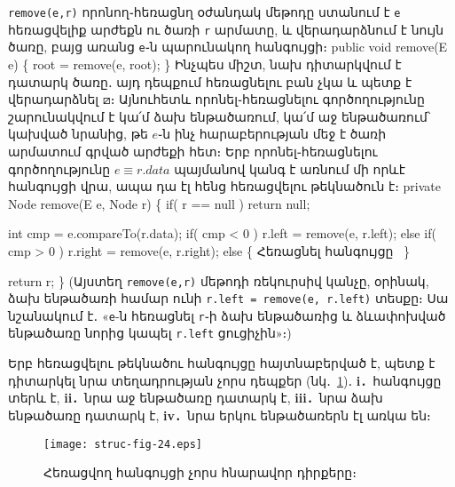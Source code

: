 \texttt{remove(e,r)} որոնող֊հեռացնղ օժանդակ մեթոդը 
ստանում է \texttt{e} հեռացվելիք արժեքն ու ծառի \texttt{r} 
արմատը, և վերադարձնում է նույն ծառը, բայց առանց \texttt{e}֊ն 
պարունակող հանգույցի։
\nwenddocs{}\endmoddef{}
public void remove(E e)
\{
  root = remove(e, root);
\}
\nwendcode{}\nwdocspar
Ինչպես միշտ, նախ դիտարկվում է դատարկ ծառը․ այդ դեպքում 
հեռացնելու բան չկա և պետք է վերադարձնել \(\boxslash\)։ 
Այնուհետև որոնել֊հեռացնելու գործողությունը շարունակվում 
է կա՛մ ձախ ենթածառում, կա՛մ աջ ենթածառում՝ կախված նրանից, 
թե \(e\)֊ն ինչ հարաբերության մեջ է ծառի արմատում գրված 
արժեքի հետ։ Երբ որոնել֊հեռացնելու գործողությունը 
\(e\equiv r.data\) պայմանով կանգ է առնում մի որևէ հանգույցի 
վրա, ապա դա էլ հենց հեռացվելու թեկնածուն է։
\nwenddocs{}\plusendmoddef
private Node remove(E e, Node r)
\{
  if( r == null )
    return null;

  int cmp = e.compareTo(r.data);
  if( cmp < 0 )
    r.left = remove(e, r.left);
  else if( cmp > 0 )
    r.right = remove(e, r.right);
  else \{
    \LA{}Հեռացնել հանգույցը~{\nwtagstyle{}}\RA{}
  \}

  return r;
\}
\nwendcode{}\nwdocspar
(Այստեղ \texttt{remove(e,r)} մեթոդի ռեկուրսիվ կանչը, 
օրինակ, ձախ ենթածառի համար ունի 
\texttt{r.left = remove(e, r.left)} տեսքը։ Սա նշանակում 
է․ «\texttt{e}-ն հեռացնել \texttt{r}֊ի ձախ ենթածառից և 
ձևափոխված ենթածառը նորից կապել \texttt{r.left} ցուցիչին»։)

Երբ հեռացվելու թեկնածու հանգույցը հայտնաբերված է, պետք 
է դիտարկել նրա տեղադրության չորս դեպքեր (նկ․~\ref{fig:bst-4})․ 
\textbf{i․}~հանգույցը տերև է, 
\textbf{ii․}~նրա աջ ենթածառը դատարկ է, 
\textbf{iii․}~նրա ձախ ենթածառը դատարկ է, 
\textbf{iv․}~նրա երկու ենթածառերն էլ առկա են։
\begin{figure}[h]
\centering
\texttt{[image: struc-fig-24.eps]}
\caption{Հեռացվող հանգույցի չորս հնարավոր դիրքերը։}
\label{fig:bst-4}
\end{figure}

